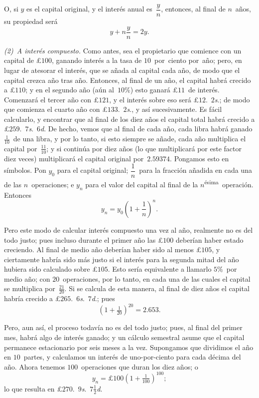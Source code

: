 \documentclass[12pt]{book}[2005/09/16]
\newcommand{\Paragraph}[1]{\medskip\pagebreak[1]\par\textit{#1}}
\newcommand{\DPPageSep}[2]{\Pagelabel{#2}}
\newcommand{\Pagelabel}[1]
  {\phantomsection\label{#1}}
\newcommand{\DPtypo}[2]{#2}%
\begin{document}
O, si $y$ es el capital original, y el interés anual
es~$\dfrac{y}{n}$, entonces, al final de $n$~años, su propiedad
será
\[
y + n\dfrac{y}{n} = 2y.
\]

\Paragraph{{\upshape(2)}~A interés compuesto.} Como antes, sea el propietario
\Pagelabel{erratum0}%
que comience con un capital de £$100$, ganando interés a la
tasa de $10$~por~ciento por~año; pero, en lugar de
atesorar el interés, que se añada al capital
cada año, de modo que el capital crezca año tras año.
Entonces, al final de un año, el capital habrá
crecido a £$110$; y en el segundo año (aún al~$10$\%)
esto ganará £$11$~de interés. Comenzará el tercer
año con £$121$, y el interés sobre eso será
£$12$.~$2$\textit{s}.; de modo que comienza el cuarto año con
£$133$.~$2$\textit{s}., y así sucesivamente. Es fácil calcularlo, y
encontrar que al final de los diez años el capital total
\DPPageSep{148.png}{136}%
habrá crecido a £$259$.~$7$\textit{s}.~$6$\textit{d}. De hecho, vemos que
al final de cada año, cada libra habrá ganado
$\tfrac{1}{10}$~de una libra, y por lo tanto, si esto siempre se añade,
cada año multiplica el capital por~$\tfrac{11}{10}$; y si
continúa por diez años (lo que multiplicará por este
factor diez veces) multiplicará el capital original
por~$\DPtypo{2.59375}{2.59374}$. Pongamos esto en símbolos.
Pon $y_0$ para el capital original; $\dfrac{1}{n}$~para la fracción
añadida en cada una de las $n$~operaciones; e $y_n$ para el
valor del capital al final de la $n$\textsuperscript{ésima}~operación.
Entonces
\[
y_n = y_0\left(1 + \frac{1}{n}\right)^n.
\]

Pero este modo de calcular interés compuesto una vez
al año, realmente no es del todo justo; pues incluso durante el
primer año las £$100$ deberían haber estado creciendo. Al
final de medio año deberían haber sido al menos £$105$,
y ciertamente habría sido más justo si
el interés para la segunda mitad del año hubiera sido
calculado sobre £$105$. Esto sería equivalente a
llamarlo $5$\%~por medio año; con $20$~operaciones, por lo tanto,
en cada una de las cuales el capital se multiplica por~$\tfrac{21}{20}$.
Si se calcula de esta manera, al final de diez años el
capital habría crecido a
\DPtypo{£$265$.~$8$\textit{s}.}
       {£$265$.~$6$\textit{s}.~$7$\textit{d}.}; pues
\[
(1 + \tfrac{1}{20})^{20} = \DPtypo{2.654}{2.653}.
\]

Pero, aun así, el proceso todavía no es del todo justo; pues,
al final del primer mes, habrá algo de
interés ganado; y un cálculo semestral asume
que el capital permanece estacionario por seis meses a la
\DPPageSep{149.png}{137}%
vez. Supongamos que dividimos el año en $10$~partes,
y calculamos un interés de uno-por-ciento para cada décima del
año. Ahora tenemos $100$~operaciones que duran
los diez años; o
\[
y_n = £100 \left( 1 + \tfrac{1}{100} \right)^{100};
\]
lo que resulta en
\DPtypo{£$270$.~$8$\textit{s}.}
       {£$270$.~$9$\textit{s}.~$7\frac{1}{2}$\textit{d}.}
\end{document}
